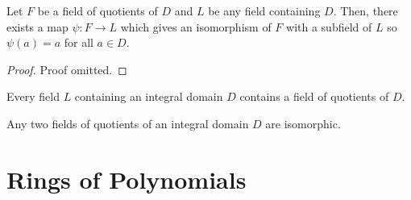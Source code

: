 \begin{theorem}
    Let $F$ be a field of quotients of $D$ and $L$ be any field containing $D$. Then, there exists a map $\psi\colon F\to L$ which gives an isomorphism of $F$ with a subfield of $L$ so $\psi(a) = a$ for all $a \in D$.
\end{theorem}
\begin{proof}
    Proof omitted.
\end{proof}
\begin{corollary}
    Every field $L$ containing an integral domain $D$ contains a field of quotients of $D$.
\end{corollary}
\begin{corollary}
    Any two fields of quotients of an integral domain $D$ are isomorphic.
\end{corollary}

\section{Rings of Polynomials}

